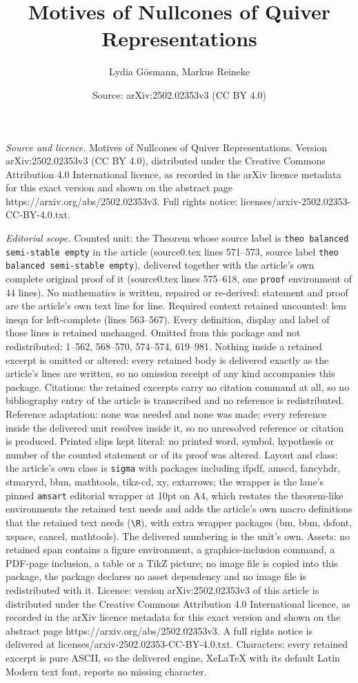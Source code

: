 \documentclass[10pt,a4paper]{amsart}
\title[Motives of Nullcones of Quiver Representations]{Motives of Nullcones of Quiver Representations}
\author{Lydia G\"osmann, Markus Reineke}
\date{Source: arXiv:2502.02353v3 (CC BY 4.0)}
\begin{document}
\maketitle

\noindent\emph{Source and licence.} Motives of Nullcones of Quiver Representations. Version arXiv:2502.02353v3 (CC BY 4.0), distributed under the Creative Commons Attribution 4.0 International licence, as recorded in the arXiv licence metadata for this exact version and shown on the abstract page https://arxiv.org/abs/2502.02353v3. Full rights notice: licenses/arxiv-2502.02353-CC-BY-4.0.txt.\par\smallskip

\noindent\textit{Editorial scope.} Counted unit: the Theorem whose source label is \texttt{theo balanced semi-stable empty} in the article (source0.tex lines 571--573, source label \texttt{theo balanced semi-stable empty}), delivered together with the article's own complete original proof of it (source0.tex lines 575--618, one \texttt{proof} environment of 44 lines). No mathematics is written, repaired or re-derived: statement and proof are the article's own text line for line. Required context retained uncounted: lem inequ for left-complete (lines 563--567). Every definition, display and label of those lines is retained unchanged. Omitted from this package and not redistributed: 1--562, 568--570, 574--574, 619--981. Nothing inside a retained excerpt is omitted or altered: every retained body is delivered exactly as the article's lines are written, so no omission receipt of any kind accompanies this package. Citations: the retained excerpts carry no citation command at all, so no bibliography entry of the article is transcribed and no reference is redistributed. Reference adaptation: none was needed and none was made; every reference inside the delivered unit resolves inside it, so no unresolved reference or citation is produced. Printed slips kept literal: no printed word, symbol, hypothesis or number of the counted statement or of its proof was altered. Layout and class: the article's own class is \texttt{sigma} with packages including ifpdf, amscd, fancyhdr, stmaryrd, bbm, mathtools, tikz-cd, xy, extarrows; the wrapper is the lane's pinned \texttt{amsart} editorial wrapper at 10pt on A4, which restates the theorem-like environments the retained text needs and adds the article's own macro definitions that the retained text needs (\texttt{\textbackslash R}), with extra wrapper packages (bm, bbm, dsfont, xspace, cancel, mathtools). The delivered numbering is the unit's own. Assets: no retained span contains a figure environment, a graphics-inclusion command, a PDF-page inclusion, a table or a TikZ picture; no image file is copied into this package, the package declares no asset dependency and no image file is redistributed with it. Licence: version arXiv:2502.02353v3 of this article is distributed under the Creative Commons Attribution 4.0 International licence, as recorded in the arXiv licence metadata for this exact version and shown on the abstract page https://arxiv.org/abs/2502.02353v3. A full rights notice is delivered at licenses/arxiv-2502.02353-CC-BY-4.0.txt. Characters: every retained excerpt is pure ASCII, so the delivered engine, XeLaTeX with its default Latin Modern text font, reports no missing character.
\end{document}
